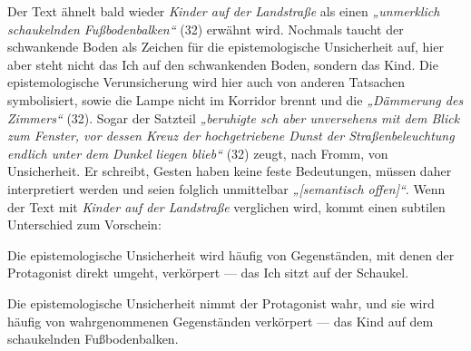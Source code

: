 \documentclass[12pt,a4paper]{article}
\begin{document}
%
Der Text ähnelt bald wieder \textit{Kinder auf der Landstraße} als einen \textit{„unmerklich schaukelnden Fußbodenbalken“} (32) erwähnt wird. Nochmals taucht der schwankende Boden als Zeichen für die epistemologische Unsicherheit auf, hier aber steht nicht das Ich auf den schwankenden Boden, sondern das Kind. Die epistemologische Verunsicherung wird hier auch von anderen Tatsachen symbolisiert, sowie die Lampe nicht im Korridor brennt und die \textit{„Dämmerung des Zimmers“} (32). Sogar der Satzteil \textit{„beruhigte sch aber unversehens mit dem Blick zum Fenster, vor dessen Kreuz der hochgetriebene Dunst der Straßenbeleuchtung endlich unter dem Dunkel liegen blieb“} (32) zeugt, nach Fromm, von Unsicherheit. Er schreibt, Gesten haben keine feste Bedeutungen, müssen daher interpretiert werden und seien folglich unmittelbar \textit{„[semantisch offen]“}.\autocite[111]{fromm} 
%
\clearpage
%
\noindent Wenn der Text mit \textit{Kinder auf der Landstraße} verglichen wird, kommt einen subtilen Unterschied zum Vorschein: 
\vspace{-1em}
\begin{description}[
        style=multiline,
        leftmargin=15em,
        labelwidth=12em,
        labelsep=0.5em
    ]
            \item [\textit{Kinder auf der Landstraße} :] Die epistemologische Unsicherheit wird häufig von Gegenständen, mit denen der Protagonist direkt umgeht, verkörpert — das Ich sitzt auf der Schaukel.
            \item [\textit{Unglücklichsein} :] Die epistemologische Unsicherheit nimmt der Protagonist wahr, und sie wird häufig von wahrgenommenen Gegenständen verkörpert — das Kind auf dem schaukelnden Fußbodenbalken.
\end{description}
\vspace{-1em}
%
\end{document}
